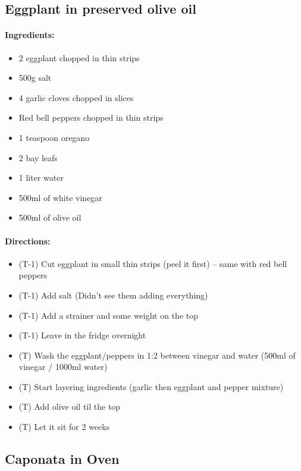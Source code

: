 \documentclass{article}
\begin{document}
\subsection{Eggplant in preserved olive oil}

\paragraph{Ingredients:}
\begin{itemize}
    \item 2 eggplant chopped in thin strips
    \item 500g salt
    \item 4 garlic cloves chopped in slices
    \item Red bell peppers chopped in thin strips
    \item 1 teaspoon oregano
    \item 2 bay leafs
    \item 1 liter water
    \item 500ml of white vinegar
    \item 500ml of olive oil
\end{itemize}

\paragraph{Directions:}
\begin{itemize}
    \item (T-1) Cut eggplant in small thin strips (peel it first) -- same with red bell peppers
    \item (T-1) Add salt (Didn't see them adding everything)
    \item (T-1) Add a strainer and some weight on the top
    \item (T-1) Leave in the fridge overnight
    \item (T) Wash the eggplant/peppers in 1:2 between vinegar and water (500ml of vinegar / 1000ml water)
    \item (T) Start layering ingredients (garlic then eggplant and pepper mixture)
    \item (T) Add olive oil til the top
    \item (T) Let it sit for 2 weeks
\end{itemize}

\subsection{Caponata in Oven}
\end{document}
